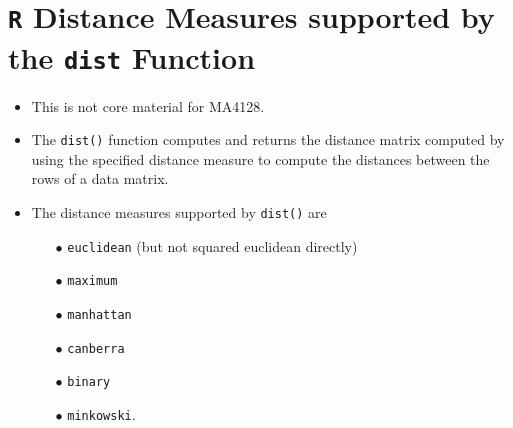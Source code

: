 \documentclass[a4paper,12pt]{report}
\begin{document}
\section{\texttt{R} Distance Measures supported by the \texttt{dist} Function}
\begin{itemize}
	\item This is not core material for MA4128.
	\item The \texttt{dist()} function computes and returns the distance matrix computed by using the specified distance measure to compute the distances between the rows of a data matrix.
	\item 
	The distance measures supported by \texttt{dist()} are
	
	\begin{itemize}
		\item[$\bullet$] \texttt{euclidean} (but not squared euclidean directly)
		\item[$\bullet$] \texttt{maximum}
		\item[$\bullet$] \texttt{manhattan}
		\item[$\bullet$] \texttt{canberra}
		\item[$\bullet$] \texttt{binary} 
		\item[$\bullet$] \texttt{minkowski}.
	\end{itemize}
\end{itemize}
\end{document}
